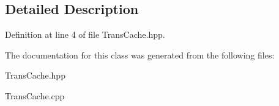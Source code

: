 \subsection{Detailed Description}


Definition at line 4 of file Trans\-Cache.\-hpp.



The documentation for this class was generated from the following files\-:\begin{DoxyCompactItemize}
\item 
Trans\-Cache.\-hpp\item 
Trans\-Cache.\-cpp\end{DoxyCompactItemize}
